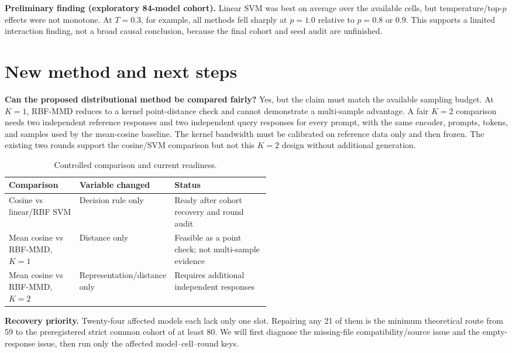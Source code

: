 \documentclass[10pt,a4paper]{article}
\begin{document}
\textbf{Preliminary finding (exploratory 84-model cohort).} Linear SVM was best
on average over the available cells, but temperature/top-$p$ effects were not
monotone. At $T=0.3$, for example, all methods fell sharply at $p=1.0$ relative
to $p=0.8$ or $0.9$. This supports a limited interaction finding, not a broad
causal conclusion, because the final cohort and seed audit are unfinished.

\clearpage
\section*{New method and next steps}

\textbf{Can the proposed distributional method be compared fairly?} Yes, but
the claim must match the available sampling budget. At $K=1$, RBF-MMD reduces
to a kernel point-distance check and cannot demonstrate a multi-sample
advantage. A fair $K=2$ comparison needs two independent reference responses
and two independent query responses for every prompt, with the same encoder,
prompts, tokens, and samples used by the mean-cosine baseline. The kernel
bandwidth must be calibrated on reference data only and then frozen. The
existing two rounds support the cosine/SVM comparison but not this $K=2$
design without additional generation.

\begin{table}[h]
\centering
\small
\caption{Controlled comparison and current readiness.}
\begin{tabularx}{\linewidth}{>{\raggedright\arraybackslash}p{0.27\linewidth}
                              >{\raggedright\arraybackslash}p{0.25\linewidth}X}
\toprule
Comparison & Variable changed & Status \\
\midrule
Cosine vs linear/RBF SVM & Decision rule only & Ready after cohort recovery and round audit \\
Mean cosine vs RBF-MMD, $K=1$ & Distance only & Feasible as a point check; not multi-sample evidence \\
Mean cosine vs RBF-MMD, $K=2$ & Representation/distance only & Requires additional independent responses \\
\bottomrule
\end{tabularx}
\end{table}

\textbf{Recovery priority.} Twenty-four affected models each lack only one
slot. Repairing any 21 of them is the minimum theoretical route from 59 to the
preregistered strict common cohort of at least 80. We will first diagnose the
missing-file compatibility/source issue and the empty-response issue, then run
only the affected model--cell--round keys.
\end{document}
